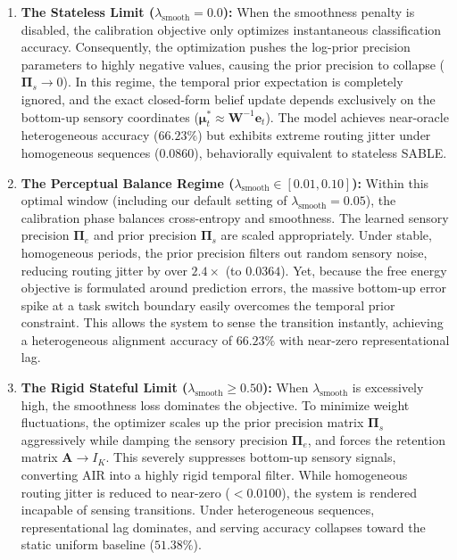 \documentclass{article}
\theoremstyle{plain}
\theoremstyle{definition}
\theoremstyle{remark}
\begin{document}
\begin{enumerate}
    \item \textbf{The Stateless Limit ($\lambda_{\text{smooth}} = 0.0$):} When the smoothness penalty is disabled, the calibration objective only optimizes instantaneous classification accuracy. Consequently, the optimization pushes the log-prior precision parameters to highly negative values, causing the prior precision to collapse ($\mathbf{\Pi}_s \to 0$). In this regime, the temporal prior expectation is completely ignored, and the exact closed-form belief update depends exclusively on the bottom-up sensory coordinates ($\mathbf{\mu}_t^* \approx \mathbf{W}^{-1} \mathbf{e}_t$). The model achieves near-oracle heterogeneous accuracy ($66.23\%$) but exhibits extreme routing jitter under homogeneous sequences ($0.0860$), behaviorally equivalent to stateless SABLE.
    \item \textbf{The Perceptual Balance Regime ($\lambda_{\text{smooth}} \in [0.01, 0.10]$):} Within this optimal window (including our default setting of $\lambda_{\text{smooth}} = 0.05$), the calibration phase balances cross-entropy and smoothness. The learned sensory precision $\mathbf{\Pi}_e$ and prior precision $\mathbf{\Pi}_s$ are scaled appropriately. Under stable, homogeneous periods, the prior precision filters out random sensory noise, reducing routing jitter by over $2.4\times$ (to $0.0364$). Yet, because the free energy objective is formulated around prediction errors, the massive bottom-up error spike at a task switch boundary easily overcomes the temporal prior constraint. This allows the system to sense the transition instantly, achieving a heterogeneous alignment accuracy of $66.23\%$ with near-zero representational lag.
    \item \textbf{The Rigid Stateful Limit ($\lambda_{\text{smooth}} \ge 0.50$):} When $\lambda_{\text{smooth}}$ is excessively high, the smoothness loss dominates the objective. To minimize weight fluctuations, the optimizer scales up the prior precision matrix $\mathbf{\Pi}_s$ aggressively while damping the sensory precision $\mathbf{\Pi}_e$, and forces the retention matrix $\mathbf{A} \to I_K$. This severely suppresses bottom-up sensory signals, converting AIR into a highly rigid temporal filter. While homogeneous routing jitter is reduced to near-zero ($<0.0100$), the system is rendered incapable of sensing transitions. Under heterogeneous sequences, representational lag dominates, and serving accuracy collapses toward the static uniform baseline ($51.38\%$).
\end{enumerate}
\end{document}
